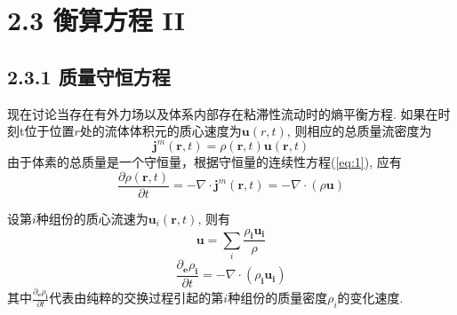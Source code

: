 \documentclass[10pt,aspectratio=43,mathserif,table]{ctexbeamer}
\newcommand{\customref}[1]{(\ref{#1})}
\begin{document}
\section{2.3 衡算方程 II}

\subsection{2.3.1 质量守恒方程}

\begin{frame}
    现在讨论当存在有外力场以及体系内部存在粘滞性流动时的熵平衡方程.
    如果在时刻t位于位置$r$处的流体体积元的质心速度为$\mathbf{u}(r,t)$, 则相应的总质量流密度为
    $$
    \mathbf{j}^m\left( \mathbf{r},t \right) =\rho \left( \mathbf{r},t \right) \mathbf{u}\left( \mathbf{r},t \right) 
    $$
    由于体素的总质量是一个守恒量，根据守恒量的连续性方程\customref{eq:1}, 应有
    \begin{equation}\label{eq:1.9}
        \frac{\partial \rho \left( \mathbf{r},t \right)}{\partial t}=-\nabla \cdot \mathbf{j}^m\left( \mathbf{r},t \right) =-\nabla \cdot \left( \rho \mathbf{u} \right) 
    \end{equation}
    
\end{frame}

\begin{frame}
    设第$i$种组份的质心流速为$\mathbf{u}_i\left( \mathbf{r},t \right) $, 则有
    $$
        \mathbf{u}=\sum_i{\frac{\rho _{\boldsymbol{i}}\mathbf{u}_{\boldsymbol{i}}}{\rho}}
    $$
    \begin{equation}\label{eq:2}
        \frac{\partial _{\boldsymbol{e}}\rho _{\boldsymbol{i}}}{\partial t}=-\nabla \cdot \left( \rho _{\boldsymbol{i}}\mathbf{u}_{\boldsymbol{i}} \right) 
    \end{equation}
    其中$\frac{\partial _{\boldsymbol{e}}\rho _{\boldsymbol{i}}}{\partial t}$代表由纯粹的交换过程引起的第$i$种组份的质量密度$\rho_i$的变化速度.
\end{frame}
\end{document}
